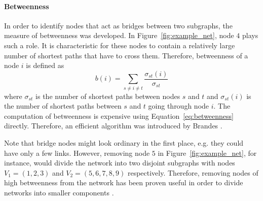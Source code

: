 \paragraph{Betweenness\color{Cayenne}{.}}
In order to identify nodes that act as bridges between two subgraphs, the measure of betweenness was developed.
In Figure~\ref{fig:example_net}, node $4$ plays such a role.
It is characteristic for these nodes to contain a relatively large number of shortest paths that have to cross them.
Therefore, betweenness of a node $i$ is defined as
\begin{equation}\label{eq:betweenness}
b(i)=\sum _{s\neq i \neq t} \frac{\sigma _{st}(i)}{\sigma _{st}}
\end{equation}
where $\sigma _{st}$ is the number of shortest paths between nodes $s$ and $t$ and $\sigma _{st} (i)$ is the number of shortest paths between $s$ and $t$ going through node $i$.
The computation of betweenness is expensive using Equation~\eqref{eq:betweenness} directly.
Therefore, an efficient algorithm was introduced by Brandes \citep{Brandes:2001p2757}.

Note that bridge nodes might look ordinary in the first place, e.g. they could have only a few links.
However, removing node $5$ in Figure~\ref{fig:example_net}, for instance, would divide the network into two disjoint subgraphs with nodes $V_1=(1,2,3)$ and $V_2=(5,6,7,8,9)$ respectively.
Therefore, removing nodes of high betweenness from the network has been proven useful in order to divide networks into smaller components \citep{girvan2002,Newman:2004}.

